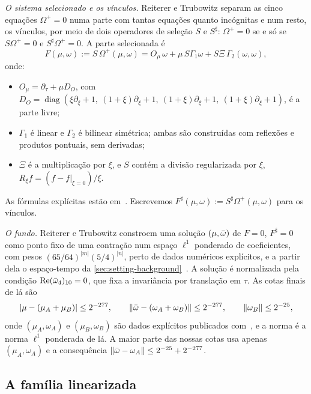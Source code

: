 \emph{O sistema selecionado e os vínculos.} Reiterer e Trubowitz separam as cinco equações
$\Omega^+=0$ numa parte com tantas equações quanto incógnitas e num resto, os vínculos, por meio de dois
operadores de seleção $S$ e $S^\sharp$: $\Omega^+=0$ se e só se $S\Omega^+=0$ e $S^\sharp\Omega^+=0$.
A parte selecionada é
\begin{equation}\label{eq:F}
  F(\mu,\omega):=S\,\Omega^+(\mu,\omega)
  =O_\mu\,\omega+\mu\,S\Gamma_1\omega+S\Xi\,\Gamma_2(\omega,\omega),
\end{equation}
onde:
\begin{itemize}[leftmargin=*]
\item $O_\mu=\partial_\tau+\mu D_O$, com $D_O=\operatorname{diag}(\xi\partial_\xi+1,\
  (1+\xi)\partial_\xi+1,\ (1+\xi)\partial_\xi+1,\ (1+\xi)\partial_\xi+1)$, é a parte livre;
\item $\Gamma_1$ é linear e $\Gamma_2$ é bilinear simétrica; ambas são construídas com reflexões e
  produtos pontuais, sem derivadas;
\item $\Xi$ é a multiplicação por $\xi$, e $S$ contém a divisão regularizada por $\xi$,
  $R_\xi f=(f-f|_{\xi=0})/\xi$.
\end{itemize}
As fórmulas explícitas estão em~\cite[\S3]{RT2019}. Escrevemos $F^\sharp(\mu,\omega):=S^\sharp\Omega^+(\mu,\omega)$
para os vínculos.

\emph{O fundo.} Reiterer e Trubowitz constroem uma solução
$(\mu,\bar\omega)$ de $F=0$, $F^\sharp=0$ como ponto fixo de uma contração num espaço $\ell^1$ ponderado
de coeficientes, com pesos $(65/64)^{|m|}(5/4)^{|n|}$, perto de dados numéricos explícitos, e a partir dela o
espaço-tempo da \cref{sec:setting-background}~\cite[\S\S4--5]{RT2019}. A solução é normalizada pela
condição $\operatorname{Re}(\bar\omega_4)_{10}=0$, que fixa a invariância por translação em $\tau$. As cotas
finais de lá são
\begin{equation}\label{eq:RTball}
  |\mu-(\mu_A+\mu_B)|\le2^{-277},\qquad \|\bar\omega-(\omega_A+\omega_B)\|\le2^{-277},\qquad
  \|\omega_B\|\le2^{-25},
\end{equation}
onde $(\mu_A,\omega_A)$ e $(\mu_B,\omega_B)$ são dados explícitos publicados com~\cite{RT2019}, e a
norma é a norma $\ell^1$ ponderada de lá. A maior parte das nossas cotas usa apenas $(\mu_A,\omega_A)$ e a
consequência $\|\bar\omega-\omega_A\|\le2^{-25}+2^{-277}$.

\subsection{A família linearizada}\label{sec:setting-linear}

